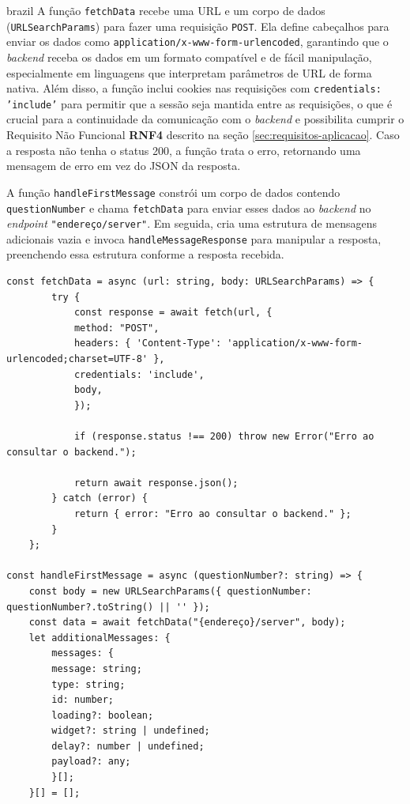 \begin{otherlanguage*}{brazil}
A função \texttt{fetchData} recebe uma URL e um corpo de dados (\texttt{URLSearchParams}) para fazer uma requisição \texttt{POST}. Ela define cabeçalhos para enviar os dados como \texttt{application/x-www-form-urlencoded}, garantindo que o \textit{backend} receba os dados em um formato compatível e de fácil manipulação, especialmente em linguagens que interpretam parâmetros de URL de forma nativa. Além disso, a função inclui cookies nas requisições com \texttt{credentials: 'include'} para permitir que a sessão seja mantida entre as requisições, o que é crucial para a continuidade da comunicação com o \textit{backend} e possibilita cumprir o Requisito Não Funcional \textbf{RNF4} descrito na seção \ref{sec:requisitos-aplicacao}. Caso a resposta não tenha o status 200, a função trata o erro, retornando uma mensagem de erro em vez do JSON da resposta. 

A função \texttt{handleFirstMessage} constrói um corpo de dados contendo \texttt{questionNumber} e chama \texttt{fetchData} para enviar esses dados ao \textit{backend} no \textit{endpoint} \texttt{"{endereço}/server"}. Em seguida, cria uma estrutura de mensagens adicionais vazia e invoca \texttt{handleMessageResponse} para manipular a resposta, preenchendo essa estrutura conforme a resposta recebida.

\begin{lstlisting}[style=ufscthesisx_style, caption={Funções assíncronas para requisição HTTP}]
    const fetchData = async (url: string, body: URLSearchParams) => {
        try {
            const response = await fetch(url, {
            method: "POST",
            headers: { 'Content-Type': 'application/x-www-form-urlencoded;charset=UTF-8' },
            credentials: 'include',
            body,
            });
    
            if (response.status !== 200) throw new Error("Erro ao consultar o backend.");
    
            return await response.json();
        } catch (error) {
            return { error: "Erro ao consultar o backend." };
        }
    };

const handleFirstMessage = async (questionNumber?: string) => {
    const body = new URLSearchParams({ questionNumber: questionNumber?.toString() || '' });
    const data = await fetchData("{endereço}/server", body);
    let additionalMessages: {
        messages: {
        message: string;
        type: string;
        id: number;
        loading?: boolean;
        widget?: string | undefined;
        delay?: number | undefined;
        payload?: any;
        }[];
    }[] = [];


\end{lstlisting}
\end{otherlanguage*}
